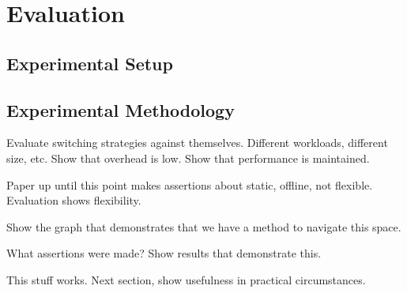 \section{Evaluation}\label{sec:evaluation}

\subsection{Experimental Setup}


\subsection{Experimental Methodology}


Evaluate switching strategies against themselves. Different workloads, different size, etc. Show that overhead is low. Show that performance is maintained.

Paper up until this point makes assertions about static, offline, not flexible. Evaluation shows flexibility.

Show the graph that demonstrates that we have a method to navigate this space.

What assertions were made? Show results that demonstrate this.

This stuff works. Next section, show usefulness in practical circumstances.

